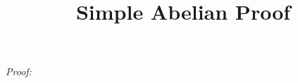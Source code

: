 \documentclass{article}%
\title{Simple Abelian Proof}%
\begin{document}
%
\normalsize%
\maketitle%
\textit{Proof:}%
\begin{enumerate}%
\addtocounter{enumi}{-1}%
\end{enumerate}%
\end{document}

